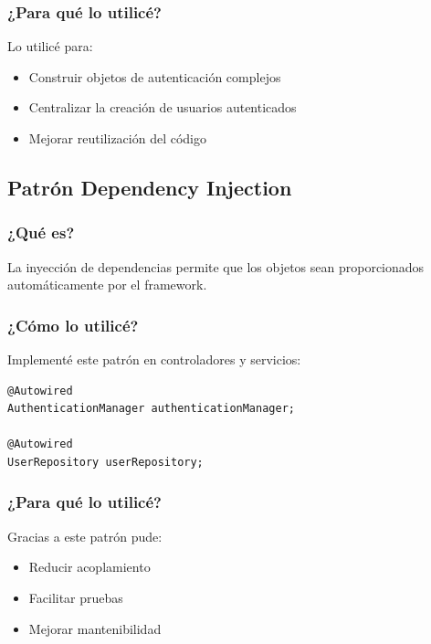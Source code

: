 \documentclass[12pt,a4paper]{article}
\begin{document}
\subsubsection{¿Para qué lo utilicé?}

Lo utilicé para:

\begin{itemize}
    \item Construir objetos de autenticación complejos
    \item Centralizar la creación de usuarios autenticados
    \item Mejorar reutilización del código
\end{itemize}

\subsection{Patrón Dependency Injection}

\subsubsection{¿Qué es?}

La inyección de dependencias permite que los objetos sean proporcionados automáticamente por el framework.

\subsubsection{¿Cómo lo utilicé?}

Implementé este patrón en controladores y servicios:

\begin{lstlisting}
@Autowired
AuthenticationManager authenticationManager;

@Autowired
UserRepository userRepository;
\end{lstlisting}

\subsubsection{¿Para qué lo utilicé?}

Gracias a este patrón pude:

\begin{itemize}
    \item Reducir acoplamiento
    \item Facilitar pruebas
    \item Mejorar mantenibilidad
\end{itemize}
\end{document}
